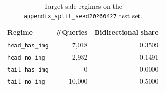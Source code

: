 \begin{table}[H]
\centering
\caption{Target-side regimes on the \texttt{appendix\_split\_seed20260427} test set.}
\label{tab:target_side_regime_counts_appendix_split_seed20260427}
\small
\begin{tabular}{lrr}
\toprule
Regime & \#Queries & Bidirectional share \\
\midrule
\texttt{head\_has\_img} & 7{,}018 & 0.3509 \\
\texttt{head\_no\_img} & 2{,}982 & 0.1491 \\
\texttt{tail\_has\_img} & 0 & 0.0000 \\
\texttt{tail\_no\_img} & 10{,}000 & 0.5000 \\
\bottomrule
\end{tabular}
\end{table}
